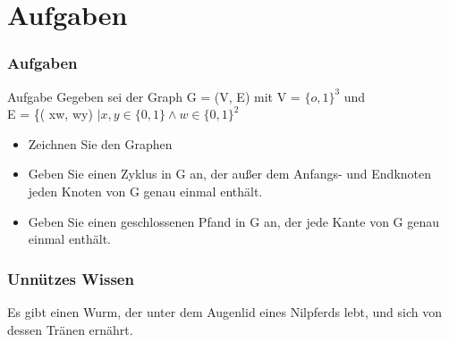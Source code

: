 \documentclass{beamer}
\begin{document}
\section{Aufgaben}

\begin{frame}
	\frametitle{Aufgaben}
	\begin{block} {Aufgabe}
		Gegeben sei der Graph G = (V, E) mit V = $\{o, 1\}^3$ und \\
		E = \{( xw, wy) $\mid x, y \in \{0, 1\} \land w \in \{0, 1\}^2$
		\begin{itemize}
			\item Zeichnen Sie den Graphen
			\item Geben Sie einen Zyklus in G an, der au{\ss}er dem Anfangs- und Endknoten jeden Knoten von G genau 					einmal enth\"alt.
			\item Geben Sie einen geschlossenen Pfand in G an, der jede Kante von G genau einmal enth\"alt.
		\end{itemize}
	\end{block}
\end{frame}

\begin{frame}
	\frametitle{Unnützes Wissen}
	\begin{center}
		Es gibt einen Wurm, der unter dem Augenlid eines Nilpferds lebt, und sich von dessen Tränen ernährt.
	\end{center}
\end{frame}
\end{document}
